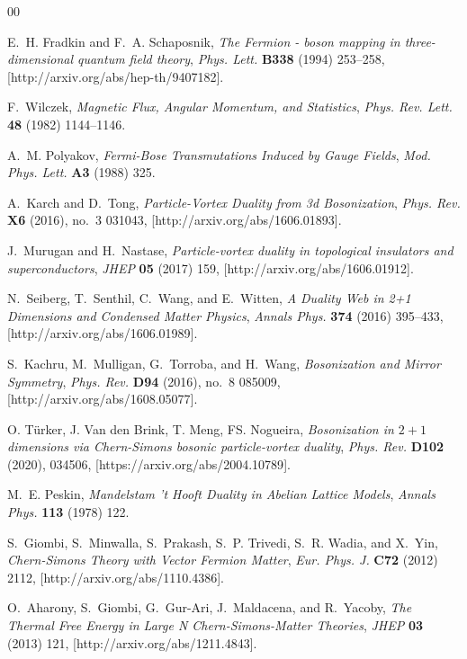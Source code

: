 \documentclass[twoside]{article}
\begin{document}
\begin{thebibliography}{00}
  
E.~H. Fradkin and F.~A. Schaposnik, {\it {The Fermion - boson mapping in
  three-dimensional quantum field theory}}, {\em Phys. Lett.} {\bf B338}
  (1994) 253--258, [{http://arxiv.org/abs/hep-th/9407182}].

F.~Wilczek, {\it {Magnetic Flux, Angular Momentum, and Statistics}}, {\em
  Phys. Rev. Lett.} {\bf 48} (1982) 1144--1146.

A.~M. Polyakov, {\it {Fermi-Bose Transmutations Induced by Gauge Fields}},
  {\em Mod. Phys. Lett.} {\bf A3} (1988) 325.

A.~Karch and D.~Tong, {\it {Particle-Vortex Duality from 3d Bosonization}},
  {\em Phys. Rev.} {\bf X6} (2016), no.~3 031043,
  [{http://arxiv.org/abs/1606.01893}].

J.~Murugan and H.~Nastase, {\it {Particle-vortex duality in topological
  insulators and superconductors}}, {\em JHEP} {\bf 05} (2017) 159,
  [{http://arxiv.org/abs/1606.01912}].

N.~Seiberg, T.~Senthil, C.~Wang, and E.~Witten, {\it {A Duality Web in 2+1
  Dimensions and Condensed Matter Physics}}, {\em Annals Phys.} {\bf 374}
  (2016) 395--433, [{http://arxiv.org/abs/1606.01989}].

S.~Kachru, M.~Mulligan, G.~Torroba, and H.~Wang, {\it {Bosonization and Mirror
  Symmetry}}, {\em Phys. Rev.} {\bf D94} (2016), no.~8 085009,
  [{http://arxiv.org/abs/1608.05077}].

O. Türker, J. Van den Brink, T. Meng, FS. Nogueira, {\it {Bosonization in $2+1$ dimensions via 
Chern-Simons bosonic particle-vortex duality}}, {\em Phys. Rev.} {\bf D102} (2020), 034506,
[{https://arxiv.org/abs/2004.10789}].


M.~E. Peskin, {\it {Mandelstam 't Hooft Duality in Abelian Lattice Models}},
  {\em Annals Phys.} {\bf 113} (1978) 122.

S.~Giombi, S.~Minwalla, S.~Prakash, S.~P. Trivedi, S.~R. Wadia, and X.~Yin,
  {\it {Chern-Simons Theory with Vector Fermion Matter}}, {\em Eur. Phys. J.}
  {\bf C72} (2012) 2112, [{http://arxiv.org/abs/1110.4386}].

O.~Aharony, S.~Giombi, G.~Gur-Ari, J.~Maldacena, and R.~Yacoby, {\it {The
  Thermal Free Energy in Large N Chern-Simons-Matter Theories}},  {\em JHEP}
  {\bf 03} (2013) 121, [{http://arxiv.org/abs/1211.4843}].
  

\end{thebibliography}
\end{document}
